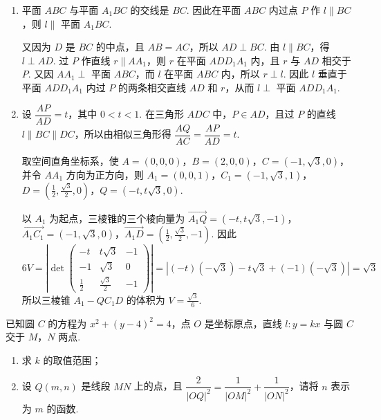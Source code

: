 \begin{solution}
\begin{enumerate}
\item 平面 \(ABC\) 与平面 \(A_{1}BC\) 的交线是 \(BC\). 因此在平面 \(ABC\) 内过点 \(P\) 作 \(l\parallel BC\)，则 \(l\parallel\) 平面 \(A_{1}BC\).

又因为 \(D\) 是 \(BC\) 的中点，且 \(AB=AC\)，所以 \(AD\perp BC\). 由 \(l\parallel BC\)，得 \(l\perp AD\). 过 \(P\) 作直线 \(r\parallel AA_{1}\)，则 \(r\) 在平面 \(ADD_{1}A_{1}\) 内，且 \(r\) 与 \(AD\) 相交于 \(P\). 又因 \(AA_{1}\perp\) 平面 \(ABC\)，而 \(l\) 在平面 \(ABC\) 内，所以 \(r\perp l\). 因此 \(l\) 垂直于平面 \(ADD_{1}A_{1}\) 内过 \(P\) 的两条相交直线 \(AD\) 和 \(r\)，从而 \(l\perp\) 平面 \(ADD_{1}A_{1}\).

\item 设 \(\dfrac{AP}{AD}=t\)，其中 \(0<t<1\). 在三角形 \(ADC\) 中，\(P\in AD\)，且过 \(P\) 的直线 \(l\parallel BC\parallel DC\)，所以由相似三角形得 \(\dfrac{AQ}{AC}=\dfrac{AP}{AD}=t\).

取空间直角坐标系，使 \(A=(0,0,0)\)，\(B=(2,0,0)\)，\(C=(-1,\sqrt3,0)\)，并令 \(AA_{1}\) 方向为正方向，则 \(A_{1}=(0,0,1)\)，\(C_{1}=(-1,\sqrt3,1)\)，\(D=\left(\frac12,\frac{\sqrt3}{2},0\right)\)，\(Q=(-t,t\sqrt3,0)\).

以 \(A_{1}\) 为起点，三棱锥的三个棱向量为
\(\overrightarrow{A_{1}Q}=(-t,t\sqrt3,-1)\)，\(\overrightarrow{A_{1}C_{1}}=(-1,\sqrt3,0)\)，\(\overrightarrow{A_{1}D}=\left(\frac12,\frac{\sqrt3}{2},-1\right)\). 因此
\[
6V=\left|\det\begin{pmatrix}
-t&t\sqrt3&-1\\
-1&\sqrt3&0\\
\frac12&\frac{\sqrt3}{2}&-1
\end{pmatrix}\right|
=\left|(-t)(-\sqrt3)-t\sqrt3+(-1)(-\sqrt3)\right|=\sqrt3
\]
所以三棱锥 \(A_{1}-QC_{1}D\) 的体积为 \(V=\frac{\sqrt3}{6}\).
\end{enumerate}
\end{solution}

\begin{problem}
已知圆 \(C\) 的方程为 \(x^{2}+\left(y-4\right)^{2}=4\)，点 \(O\) 是坐标原点，直线 \(l:y=kx\) 与圆 \(C\) 交于 \(M\)，\(N\) 两点.
\begin{enumerate}
\item 求 \(k\) 的取值范围；
\item 设 \(Q(m,n)\) 是线段 \(MN\) 上的点，且 \(\dfrac{2}{|OQ|^{2}}=\dfrac{1}{|OM|^{2}}+\dfrac{1}{|ON|^{2}}\)，请将 \(n\) 表示为 \(m\) 的函数.
\end{enumerate}
\end{problem}

